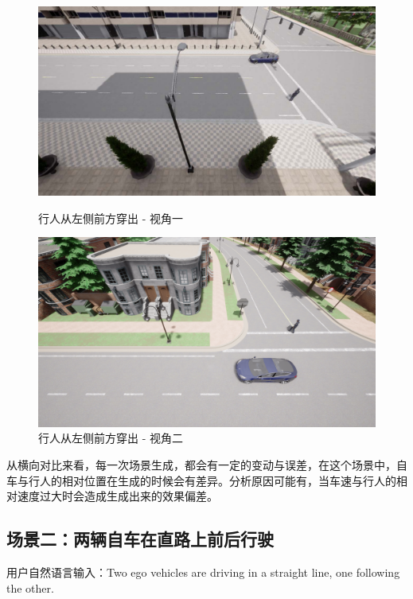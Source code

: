 \begin{figure}[H]
	\centering
	\begin{minipage}[t]{0.48\textwidth}
		\centering
		\includegraphics[width=\linewidth]{"images/场景6.pdf"}
		\caption{行人从左侧前方穿出 - 视角一}
		\label{fig:scene6_1}
	\end{minipage}%
	\hfill
	\begin{minipage}[t]{0.48\textwidth}
		\centering
		\includegraphics[width=\linewidth]{"images/场景6.1.png"}
		\caption{行人从左侧前方穿出 - 视角二}
		\label{fig:scene6_2}
	\end{minipage}
\end{figure}
从横向对比来看，每一次场景生成，都会有一定的变动与误差，在这个场景中，自车与行人的相对位置在生成的时候会有差异。分析原因可能有，当车速与行人的相对速度过大时会造成生成出来的效果偏差。
\subsection{场景二：两辆自车在直路上前后行驶}
用户自然语言输入：Two ego vehicles are driving in a straight line, one following the other.

